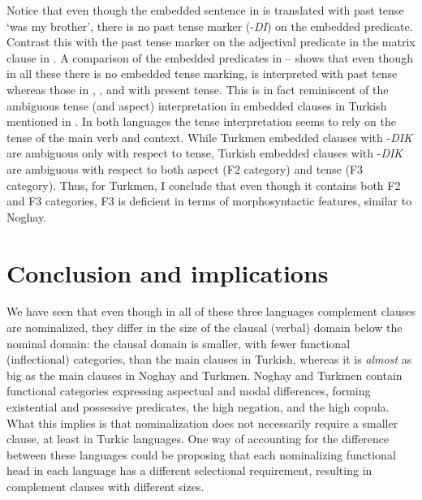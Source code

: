 \documentclass[output=paper]{langsci/langscibook}
\begin{document}
Notice that even though the embedded sentence in  is translated with past tense `was my brother', there is no past tense marker (-\textit{DI}) on the embedded predicate. 
Contrast this with the past tense marker on the adjectival predicate in the matrix clause in . 
A comparison of the embedded predicates in -- shows that even though in all these there is no embedded tense marking,  is interpreted with past tense whereas those in , , and  with present tense. 
This is in fact reminiscent of the ambiguous tense (and aspect) interpretation in embedded clauses in Turkish mentioned in . 
In both languages the tense interpretation seems to rely on the tense of the main verb and context. 
While Turkmen embedded clauses with -\textit{DIK} are ambiguous only with respect to tense, Turkish embedded clauses with -\textit{DIK} are ambiguous with respect to both aspect (F2 category) and tense (F3 category). 
Thus, for Turkmen, I conclude that even though it contains both F2 and F3 categories, F3 is deficient in terms of morphosyntactic features, similar to Noghay.

\section{Conclusion and implications} 
\label{kelepirsec:key:3}
   
We have seen that even though in all of these three languages complement clauses are nominalized, they differ in the size of the clausal (verbal) domain below the nominal domain: 
the clausal domain is smaller, with fewer functional (inflectional) categories, than the main clauses in Turkish, whereas it is \textit{almost} as big as the main clauses in Noghay and Turkmen. 
Noghay and Turkmen contain functional categories expressing aspectual and modal differences, forming existential and possessive predicates, the high negation, and the high copula. 
What this implies is that nominalization does not necessarily require a smaller clause, at least in Turkic languages. 
One way of accounting for the difference between these languages could be proposing that each nominalizing functional head in each language has a different selectional requirement, resulting in complement clauses with different sizes.
\end{document}
